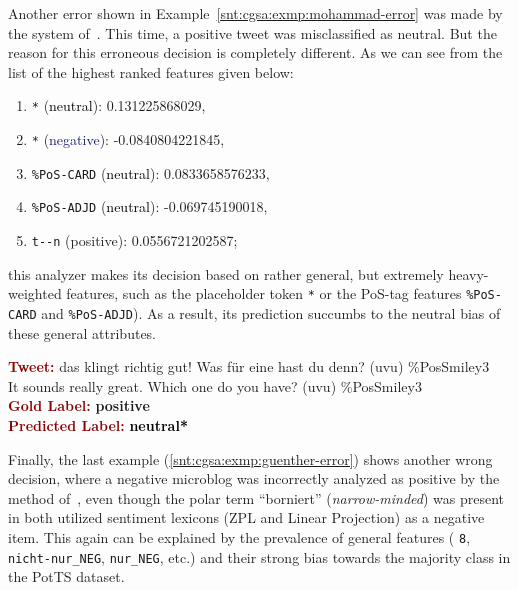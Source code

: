 Another error shown in Example~\ref{snt:cgsa:exmp:mohammad-error} was
made by the system of~\citet{Mohammad:13}.  This time, a positive
tweet was misclassified as neutral.  But the reason for this erroneous
decision is completely different.  As we can see from the list of the
highest ranked features given below:
\begin{enumerate}
\item \texttt{*} (\textcolor{black}{neutral}): 0.131225868029,
\item \texttt{*} (\textcolor{midnightblue}{negative}): -0.0840804221845,
\item \texttt{\%PoS-CARD} (\textcolor{black}{neutral}): 0.0833658576233,
\item \texttt{\%PoS-ADJD} (\textcolor{black}{neutral}): -0.069745190018,
\item \texttt{t-\textvisiblespace{}-n} (\textcolor{green3}{positive}): 0.0556721202587;
\end{enumerate}
this analyzer makes its decision based on rather general, but
extremely heavy-weighted features, such as the placeholder token
\texttt{*} or the PoS-tag features \texttt{\%PoS-CARD} and
\texttt{\%PoS-ADJD}).  As a result, its prediction succumbs to the
neutral bias of these general attributes.

\begin{example}\label{snt:cgsa:exmp:mohammad-error}
  \noindent\textup{\bfseries\textcolor{darkred}{Tweet:}} {\upshape das
    klingt richtig gut! Was f\"ur eine hast du denn? (uvu) \%PosSmiley3}\\
  \noindent It sounds really great.  Which one do you have? (uvu) \%PosSmiley3\\[\exampleSep]
  \noindent\textup{\bfseries\textcolor{darkred}{Gold Label:}}\hspace*{4.3em}\textbf{%
    \upshape\textcolor{green3}{positive}}\\
 \noindent\textup{\bfseries\textcolor{darkred}{Predicted Label:}}\hspace*{2em}\textbf{%
    \upshape\textcolor{black}{neutral*}}
\end{example}

Finally, the last example (\ref{snt:cgsa:exmp:guenther-error}) shows
another wrong decision, where a negative microblog was incorrectly
analyzed as positive by the method of~\citet{Guenther:14}, even though
the polar term ``borniert'' (\emph{narrow-minded}) was present in both
utilized sentiment lexicons (ZPL and Linear Projection) as a negative
item.  This again can be explained by the prevalence of general
features (\eg{} \texttt{8}, \texttt{nicht-nur\_NEG},
\texttt{nur\_NEG}, etc.) and their strong bias towards the majority
class in the PotTS dataset.

